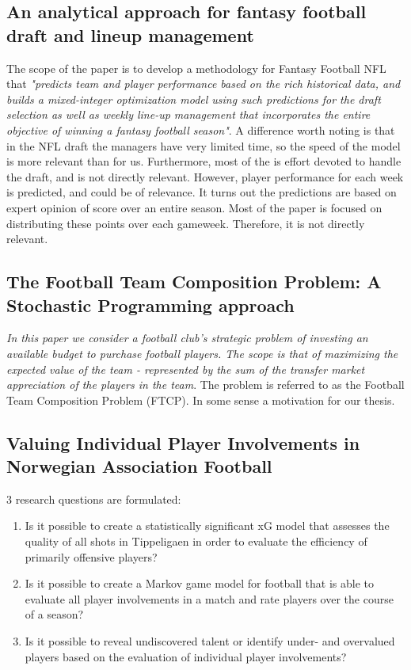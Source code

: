 \subsection{An analytical approach for fantasy football draft
and lineup management}
The scope of the paper is to develop a methodology for Fantasy Football NFL that \textit{"predicts team and player performance based on the rich historical data, and builds a mixed-integer optimization model using such predictions for the draft selection as well as weekly line-up management that incorporates the entire objective of winning a fantasy football season"}. A difference worth noting is that in the NFL draft the managers have very limited time, so the speed of the model is more relevant than for us. Furthermore, most of the is effort devoted to handle the draft, and is not directly relevant. However, player performance for each week is predicted, and could be of relevance. It turns out the predictions are based on expert opinion of score over an entire season. Most of the paper is focused on distributing these points over each gameweek. Therefore, it is not directly relevant. 
\newpar

\subsection{The Football Team Composition Problem: A Stochastic Programming approach}
\textit{In this paper we consider a football club’s strategic problem of investing an available budget to purchase football players. The scope is that of maximizing the expected value of the team - represented by the sum of the transfer market appreciation of the players in the team}. The problem is referred to as the Football Team Composition Problem (FTCP). In some sense a motivation for our thesis.

\subsection{Valuing Individual Player Involvements in
Norwegian Association Football}

3 research questions are formulated:
\begin{enumerate}
    \item Is it possible to create a statistically significant xG model that assesses the quality of all shots in Tippeligaen in order to evaluate the efficiency of primarily offensive players?
    \item Is it possible to create a Markov game model for football that is able to evaluate all player involvements in a match and rate players over the course of a season?
    \item Is it possible to reveal undiscovered talent or identify under- and overvalued players based on the evaluation of individual player involvements?
\end{enumerate} 

